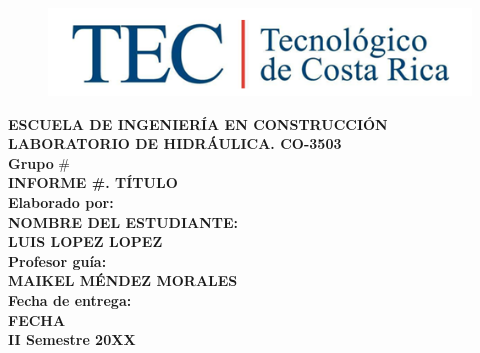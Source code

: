 \documentclass[11pt, letterpaper]{article}
\begin{document}
\begin{titlepage}

\begin{center}

\begin{figure}[H]
	\centering
	\includegraphics[width=1\columnwidth]{LOGO_TEC.png}
\end{figure}

\textbf{\large{ESCUELA DE INGENIERÍA EN CONSTRUCCIÓN}}\\ 
\textbf{\large{LABORATORIO DE HIDRÁULICA. CO-3503}}\\
\textbf{\large{Grupo}} \# \\
\vspace{1in} %
\textbf{\large{INFORME \#. TÍTULO}}\\
\vspace{1in} %
\textbf{\large{Elaborado por:}}\\
\textbf{\large{NOMBRE DEL ESTUDIANTE:}}\\
\textbf{\large{LUIS LOPEZ LOPEZ}}\\
\vspace{0.5in} %
\textbf{\large{Profesor guía:}}\\
\textbf{\large{MAIKEL MÉNDEZ MORALES}}\\
\vspace{0.5in} %
\textbf{\large{Fecha de entrega:}}\\
\textbf{\large{FECHA}}\\
\vspace{1in} %
\textbf{\large{II Semestre 20XX}}\\

\end{center}

\end{titlepage}

\tableofcontents
\end{document}
